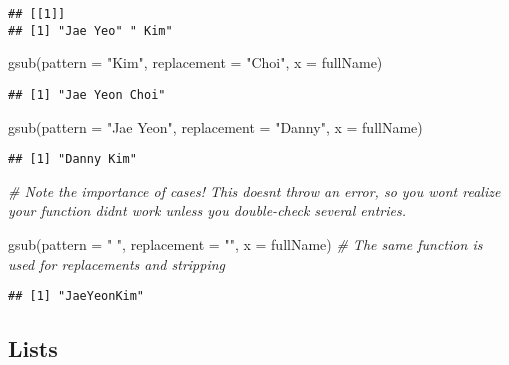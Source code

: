 \documentclass[
]{book}
\newenvironment{Shaded}{\begin{snugshade}}{\end{snugshade}}
\newcommand{\AttributeTok}[1]{\textcolor[rgb]{0.77,0.63,0.00}{#1}}
\newcommand{\CommentTok}[1]{\textcolor[rgb]{0.56,0.35,0.01}{\textit{#1}}}
\newcommand{\FunctionTok}[1]{\textcolor[rgb]{0.00,0.00,0.00}{#1}}
\newcommand{\NormalTok}[1]{#1}
\newcommand{\StringTok}[1]{\textcolor[rgb]{0.31,0.60,0.02}{#1}}
\begin{document}
\begin{verbatim}
## [[1]]
## [1] "Jae Yeo" " Kim"
\end{verbatim}

\begin{Shaded}
\begin{Highlighting}[]
\FunctionTok{gsub}\NormalTok{(}\AttributeTok{pattern =} \StringTok{"Kim"}\NormalTok{, }\AttributeTok{replacement =} \StringTok{"Choi"}\NormalTok{, }\AttributeTok{x =}\NormalTok{ fullName)}
\end{Highlighting}
\end{Shaded}

\begin{verbatim}
## [1] "Jae Yeon Choi"
\end{verbatim}

\begin{Shaded}
\begin{Highlighting}[]
\FunctionTok{gsub}\NormalTok{(}\AttributeTok{pattern =} \StringTok{"Jae Yeon"}\NormalTok{, }\AttributeTok{replacement =} \StringTok{"Danny"}\NormalTok{, }\AttributeTok{x =}\NormalTok{ fullName)}
\end{Highlighting}
\end{Shaded}

\begin{verbatim}
## [1] "Danny Kim"
\end{verbatim}

\begin{Shaded}
\begin{Highlighting}[]
\CommentTok{\# Note the importance of cases! This doesn\textquotesingle{}t throw an error, so you won\textquotesingle{}t realize your function didn\textquotesingle{}t work unless you double{-}check several entries.}

\FunctionTok{gsub}\NormalTok{(}\AttributeTok{pattern =} \StringTok{" "}\NormalTok{, }\AttributeTok{replacement =} \StringTok{""}\NormalTok{, }\AttributeTok{x =}\NormalTok{ fullName) }\CommentTok{\# The same function is used for replacements and stripping}
\end{Highlighting}
\end{Shaded}

\begin{verbatim}
## [1] "JaeYeonKim"
\end{verbatim}

\hypertarget{lists-1}{%
\subsection{Lists}\label{lists-1}}
\end{document}
